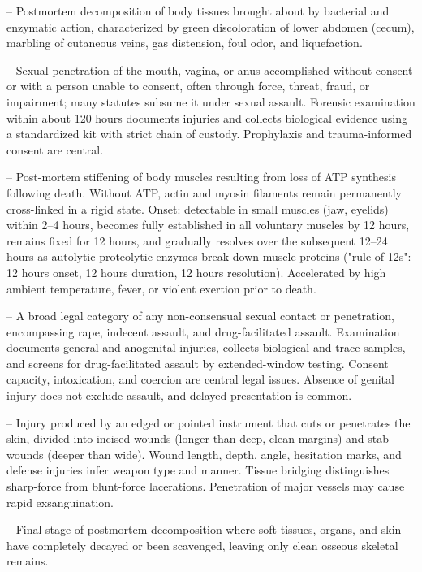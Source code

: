 -- Postmortem decomposition of body tissues brought about by bacterial and enzymatic action, characterized by green discoloration of lower abdomen (cecum), marbling of cutaneous veins, gas distension, foul odor, and liquefaction.

-- Sexual penetration of the mouth, vagina, or anus accomplished without consent or with a person unable to consent, often through force, threat, fraud, or impairment; many statutes subsume it under sexual assault. Forensic examination within about 120 hours documents injuries and collects biological evidence using a standardized kit with strict chain of custody. Prophylaxis and trauma-informed consent are central.

-- Post-mortem stiffening of body muscles resulting from loss of ATP synthesis following death. Without ATP, actin and myosin filaments remain permanently cross-linked in a rigid state. Onset: detectable in small muscles (jaw, eyelids) within 2--4 hours, becomes fully established in all voluntary muscles by 12 hours, remains fixed for 12 hours, and gradually resolves over the subsequent 12--24 hours as autolytic proteolytic enzymes break down muscle proteins ("rule of 12s": 12 hours onset, 12 hours duration, 12 hours resolution). Accelerated by high ambient temperature, fever, or violent exertion prior to death.

-- A broad legal category of any non-consensual sexual contact or penetration, encompassing rape, indecent assault, and drug-facilitated assault. Examination documents general and anogenital injuries, collects biological and trace samples, and screens for drug-facilitated assault by extended-window testing. Consent capacity, intoxication, and coercion are central legal issues. Absence of genital injury does not exclude assault, and delayed presentation is common.

-- Injury produced by an edged or pointed instrument that cuts or penetrates the skin, divided into incised wounds (longer than deep, clean margins) and stab wounds (deeper than wide). Wound length, depth, angle, hesitation marks, and defense injuries infer weapon type and manner. Tissue bridging distinguishes sharp-force from blunt-force lacerations. Penetration of major vessels may cause rapid exsanguination.

-- Final stage of postmortem decomposition where soft tissues, organs, and skin have completely decayed or been scavenged, leaving only clean osseous skeletal remains.

